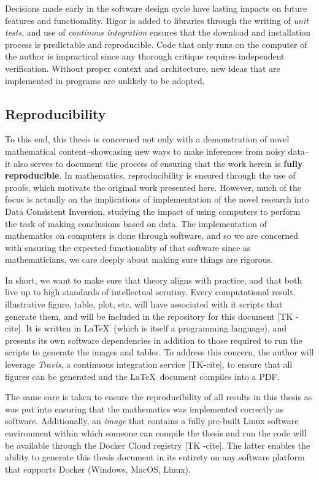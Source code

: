 Decisions made early in the software design cycle have lasting impacts on future features and functionality.
Rigor is added to libraries through the writing of \emph{unit tests}, and use of \emph{continous integration} ensures that the download and installation process is predictable and reproducible. 
Code that only runs on the computer of the author is impractical since any thorough critique requires independent verification.
Without proper context and architecture, new ideas that are implemented in programs are unlikely to be adopted.

\subsection{Reproducibility}
To this end, this thesis is concerned not only with a demonstration of novel mathematical content\---showcasing new ways to make inferences from noisy data\---it also serves to document the process of ensuring that the work herein is \textbf{fully reproducible}.
In mathematics, reproducibility is ensured through the use of proofs, which motivate the original work presented here.
However, much of the focus is actually on the implications of implementation of the novel research into Data Consistent Inversion, studying the impact of using computers to perform the task of making conclusions based on data.
The implementation of mathematics on computers is done through software, and so we are concerned with ensuring the expected functionality of that software since as mathematicians, we care deeply about making sure things are rigorous. 

In short, we want to make sure that theory aligns with practice, and that both live up to high standards of intellectual scrutiny. 
Every computational result, illustrative figure, table, plot, etc. will have associated with it scripts that generate them, and will be included in the  repository for this document [TK - cite]. 
It is written in \LaTeX\, (which is itself a programming language), and presents its own software dependencies in addition to those required to run the scripts to generate the images and tables. 
To address this concern, the author will leverage \emph{Travis}, a continuous integration service [TK-cite], to ensure that all figures can be generated and the \LaTeX\, document compiles into a PDF.

The same care is taken to ensure the reproducibility of all results in this thesis as was put into ensuring that the mathematics was implemented correctly as software. 
Additionally, an \emph{image} that contains a fully pre-built Linux software environment within which someone can compile the thesis and run the code will be available through the Docker Cloud registry [TK -cite]. 
The latter enables the ability to generate this thesis document in its entirety on any software platform that supports Docker (Windows, MacOS, Linux).

